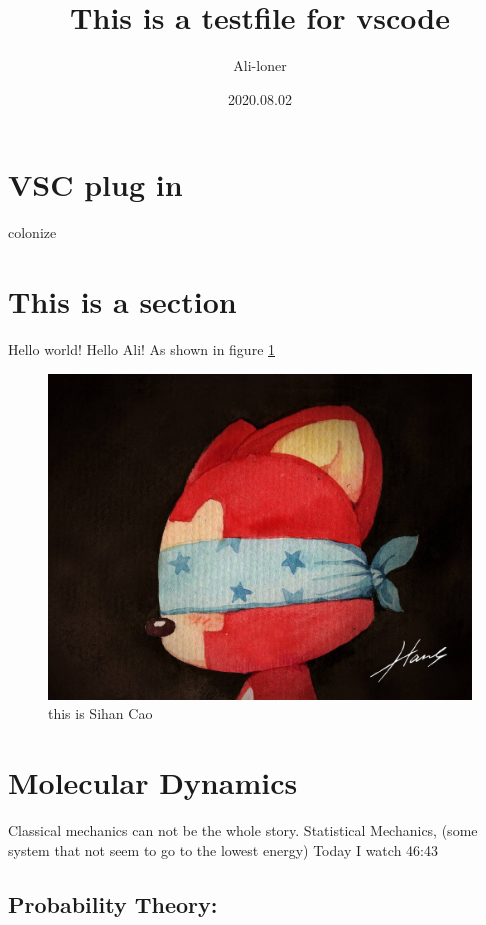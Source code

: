 \documentclass[a4paper]{article}
\title{\heiti\zihao{2} This is a testfile for vscode}
\author{\songti Ali-loner}
\date{2020.08.02}
\begin{document}
	\maketitle
	\thispagestyle{empty}

\begin{abstract}
	\lipsum[2]
\end{abstract}

\tableofcontents

\section{VSC plug in}
colonize

\section{This is a section}
Hello world! Hello Ali! As shown in figure \ref{1}
\begin{figure}[htbp]
	\centering
	\includegraphics[scale=0.2]{Ali.jpg}
	\caption{this is Sihan Cao}
	\label{1}
\end{figure}

\section{Molecular Dynamics}
Classical mechanics can not be the whole story.
Statistical Mechanics, (some system that not seem to go to the lowest energy)
\bigskip
Today I watch 46:43
\bigskip

\subsection{Probability Theory:}
\end{document}
